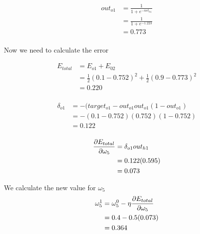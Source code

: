 \documentclass[10pt,a4paper]{article}
\begin{document}
\begin{equation}
\begin{split}
out_{o1} &= \frac{1}{1+e^{-net_{h1}}}\\ 
         &= \frac{1}{1+e^{-1.223}}\\ 
         &= 0.773\\
\end{split}
\end{equation}






















Now we need to calculate the error

\begin{equation}
\begin{split}
E_{total} &= E_{o1} + E_{02} \\
          &= \frac{1}{2}(0.1-0.752)^2 + \frac{1}{2}(0.9 - 0.773)^2 \\
          &= 0.220 \\
\end{split}
\end{equation}

\begin{equation}
\begin{split}
\delta_{o1} &= -(target_{o1} -out_{o1}out_{o1}(1-out_{o1})\\
            &= -(0.1-0.752)(0.752)(1-0.752)\\
            &= 0.122\\
\end{split}
\end{equation}

\begin{equation}
\begin{split}
\pdv{E_{total}}{\omega_5} &= \delta_{o1}out_{h1}\\
                          &= 0.122(0.595)\\
                          &= 0.073\\
\end{split}
\end{equation}

We calculate the new value for $\omega_5$
\begin{equation}
\begin{split}
\omega_5^1 &= \omega_5^0 - \eta\pdv{E_{total}}{\omega_5}\\
           &= 0.4 -0.5(0.073)\\
           &= 0.364\\
\end{split}
\end{equation}
\end{document}

